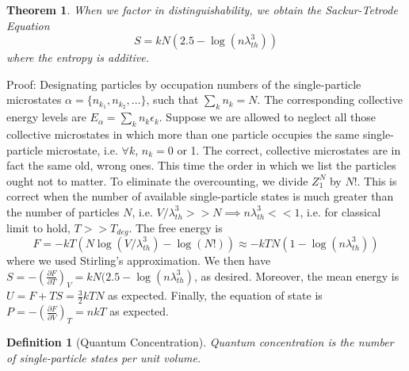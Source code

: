 \documentclass[a4paper]{article}
\theoremstyle{new}
\newtheorem{defi}{Definition}[section]
\newtheorem{thm}{Theorem}[section]
\begin{document}
\begin{thm}
When we factor in distinguishability, we obtain the Sackur-Tetrode Equation
$$S=kN(2.5-\log(n\lambda_{th}^3))$$
where the entropy is additive.
\end{thm}
Proof: Designating particles by occupation numbers of the single-particle microstates $\alpha=\{n_{k_1},n_{k_2},...\}$, such that $\sum_kn_k=N$. The corresponding collective energy levels are $E_\alpha=\sum_kn_k\epsilon_k$. Suppose we are allowed to neglect all those collective microstates in which more than one particle occupies the same single-particle microstate, i.e. $\forall k$, $n_k=0$ or 1. The correct, collective microstates are in fact the same old, wrong ones. This time the order in which we list the particles ought not to matter. To eliminate the overcounting, we divide $Z_1^N$ by $N!$. This is correct when the number of available single-particle states is much greater than the number of particles $N$, i.e. $V/\lambda_{th}^3>>N\implies n\lambda_{th}^3<<1$, i.e. for classical limit to hold, $T>>T_{deg}$. The free energy is
$$F=-kT(N\log(V/\lambda_{th}^3)-\log(N!))\approx -kTN(1-\log(n\lambda_{th}^3))$$
where we used Stirling's approximation. We then have $S=-(\frac{\partial F}{\partial T})_V=kN(2.5-\log(n\lambda_{th}^3)$, as desired. Moreover, the mean energy is $U=F+TS=\frac{3}{2}kTN$ as expected. Finally, the equation of state is $P=-(\frac{\partial F}{\partial V})_T=nkT$ as expected.
\begin{defi}[Quantum Concentration]
Quantum concentration is the number of single-particle states per unit volume.
\end{defi}
\newpage
\end{document}

